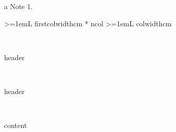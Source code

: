\begin{ThreePartTable}
  \tiny
  \begin{TableNotes}
  \item[a] Note 1.
  \end{TableNotes}

  \begin{longtable}
    {>{\hangindent=1em}L{ {{firstcolwidth}}cm}
      *{ {{ncol}} }{
        >{\hangindent=1em}L{ {{colwidth}}cm}
      }}
    
    \caption{ {{caption}} }\label{ tab:{{label}} }\\
    \toprule[2pt]                   

    {{{header}}}

    \midrule
    \endfirsthead

    \\
    \midrule 
    
    {{{header}}}

    \midrule
    \endhead

    \midrule
    \\
    \endfoot

    \bottomrule
    \insertTableNotes
    \endlastfoot

    {{{content}}}
    
  \end{longtable}
\end{ThreePartTable}
